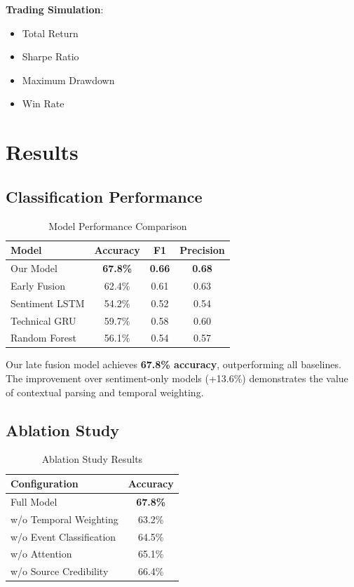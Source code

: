 \documentclass[conference]{IEEEtran}
\begin{document}
\textbf{Trading Simulation}:
\begin{itemize}
    \item Total Return
    \item Sharpe Ratio
    \item Maximum Drawdown
    \item Win Rate
\end{itemize}

\section{Results}

\subsection{Classification Performance}

\begin{table}[ht]
\centering
\caption{Model Performance Comparison}
\begin{tabular}{|l|c|c|c|}
\hline
\textbf{Model} & \textbf{Accuracy} & \textbf{F1} & \textbf{Precision} \\
\hline
Our Model & \textbf{67.8\%} & \textbf{0.66} & \textbf{0.68} \\
Early Fusion & 62.4\% & 0.61 & 0.63 \\
Sentiment LSTM & 54.2\% & 0.52 & 0.54 \\
Technical GRU & 59.7\% & 0.58 & 0.60 \\
Random Forest & 56.1\% & 0.54 & 0.57 \\
\hline
\end{tabular}
\label{tab:results}
\end{table}

Our late fusion model achieves \textbf{67.8\% accuracy}, outperforming all baselines. The improvement over sentiment-only models (+13.6\%) demonstrates the value of contextual parsing and temporal weighting.

\subsection{Ablation Study}

\begin{table}[ht]
\centering
\caption{Ablation Study Results}
\begin{tabular}{|l|c|}
\hline
\textbf{Configuration} & \textbf{Accuracy} \\
\hline
Full Model & \textbf{67.8\%} \\
w/o Temporal Weighting & 63.2\% \\
w/o Event Classification & 64.5\% \\
w/o Attention & 65.1\% \\
w/o Source Credibility & 66.4\% \\
\hline
\end{tabular}
\label{tab:ablation}
\end{table}
\end{document}
